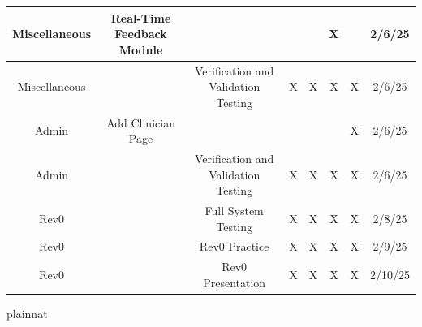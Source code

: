 \documentclass[12pt, titlepage]{article}
\begin{document}
\begin{landscape}
\begin{longtable}{|c|c|c|c|c|c|c|c|}
      Miscellaneous & Real-Time Feedback Module & ~ & ~ & ~ & X & ~ & 2/6/25 \\ \hline
      Miscellaneous & ~ & Verification and Validation Testing & X & X & X & X & 2/6/25 \\ \hline
      Admin & Add Clinician Page & ~ & ~ & ~ & ~ & X & 2/6/25 \\ \hline
      Admin & ~ & Verification and Validation Testing & X & X & X & X & 2/6/25 \\ \hline
      Rev0 & ~ & Full System Testing & X & X & X & X & 2/8/25 \\ \hline
      Rev0 & ~ & Rev0 Practice & X & X & X & X & 2/9/25 \\ \hline
      Rev0 & ~ & Rev0 Presentation & X & X & X & X & 2/10/25 \\ \hline
\end{longtable}
\normalsize
\end{landscape}

 {plainnat}


\newpage{}
\end{document}
